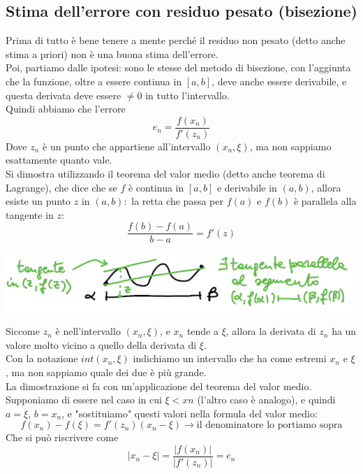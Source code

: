 \subsection{Stima dell'errore con residuo pesato (bisezione)}
Prima di tutto è bene tenere a mente perché il residuo non pesato (detto anche stima a priori) non è una buona stima dell'errore.\\
Poi, partiamo dalle ipotesi: sono le stesse del metodo di bisezione, con l'aggiunta che la funzione, oltre a essere continua in $[a,b]$, deve anche essere derivabile, e questa derivata deve essere $\neq 0$ in tutto l'intervallo.\\
Quindi abbiamo che l'errore 
\begin{displaymath}
    e_n=\frac{f(x_n)}{f'(z_n)}
\end{displaymath}
Dove $z_n$ è un punto che appartiene all'intervallo $(x_n, \xi)$, ma non sappiamo esattamente quanto vale.\\
Si dimostra utilizzando il teorema del valor medio (detto anche teorema di Lagrange), che dice che se $f$ è continua in $[a,b]$ e derivabile in $(a,b)$, allora esiste un punto $z$ in $(a,b):$ la retta che passa per $f(a)$ e $f(b)$ è parallela alla tangente in $z$:
\begin{displaymath}
    \frac{f(b)-f(a)}{b-a}=f'(z)
\end{displaymath}

\begin{center}
    \includegraphics[scale=0.7]{./res/img/lagrange1.png}
\end{center}
Siccome $z_n$ è nell'intervallo $(x_n,\xi)$, e $x_n$ tende a $\xi$, allora la derivata di $z_n$ ha un valore molto vicino a quello della derivata di $\xi$.\\
Con la notazione $int(x_n,\xi)$ indichiamo un intervallo che ha come estremi $x_n$ e $\xi$, ma non sappiamo quale dei due è più grande.\\
La dimostrazione si fa con un'applicazione del teorema del valor medio. Supponiamo di essere nel caso in cui $\xi < xn$ (l'altro caso è analogo), e quindi $a=\xi$, $b=x_n$, e "sostituiamo" questi valori nella formula del valor medio:\\
\begin{displaymath}
    f(x_n)-f(\xi)=f'(z_n)(x_n-\xi) \xrightarrow{}\text{il denominatore lo portiamo sopra}
\end{displaymath}
Che si può riscrivere come
\begin{displaymath}
    |x_n-\xi|=\frac{|f(x_n)|}{|f'(z_n)|}=e_n
\end{displaymath}
